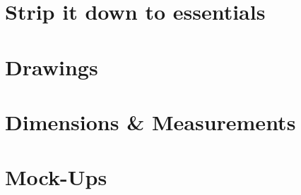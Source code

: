 \section{Strip it down to essentials}


\section{Drawings}


\section{Dimensions \& Measurements}


\section{Mock-Ups}
